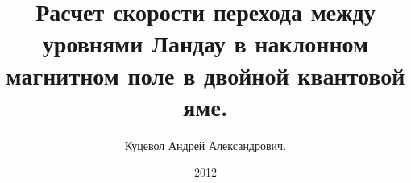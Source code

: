 \usepackage[cm-default]{fontspec} %
\usepackage{xunicode} %
\usepackage{xltxtra} %
\usepackage{indentfirst} %

\usepackage{cmap}
\usepackage[english,russian]{babel}
\usepackage{amssymb,amsfonts,amsmath,mathtext}
\usepackage{cite,enumerate,float,indentfirst}



\setsansfont{Times New Roman}
\setmonofont{Times New Roman}
\setmainfont{Times New Roman} %

\emergencystretch=0.74cm


\title{Расчет скорости перехода между уровнями Ландау в наклонном магнитном поле в двойной квантовой яме.}
\author{Куцевол Андрей Александрович.}
\date{2012}


\newcommand{\beq}{\begin{equation}\begin{gathered}}
\newcommand{\beqn}{\begin{equation}\begin{gathered} \nonumber }
\newcommand{\eeq}{\end{gathered}\end{equation}}


\newcommand{\bdft}{\begin{dft}}
\newcommand{\edft}{\end{dft}}

\newcommand{\bexe}{\begin{exe}}
\newcommand{\eexe}{\end{exe}}

\newcommand{\brem}{\begin{rem}}
\newcommand{\erem}{\end{rem}}

\newcommand{\btrm}{\begin{trm}}
\newcommand{\etrm}{\end{trm}}
\newcommand{\angstr}{\stackrel{\circ}{\mathrm{A}}}

\newcommand{\bprf}{\begin{prf}}
\newcommand{\eprf}{\end{prf}}


\newcommand{\pal}{\partial}
\newcommand{\my}{\mu}

\newcommand{\hx}{\hspace{1ex}}
\newcommand{\hxx}{\hspace{2ex}}
\newcommand{\hxxx}{\hspace{3ex}}


\newcommand{\bfr}{\mathbf{r}}
\newcommand{\bft}{\mathbf{t}}
\newcommand{\bfn}{\mathbf{n}}
\newcommand{\bfm}{\mathbf{m}}
\newcommand{\bfi}{\mathbf{i}}
\newcommand{\bfj}{\mathbf{j}}
\newcommand{\bfk}{\mathbf{k}}
\newcommand{\bfb}{\mathbf{b}}
\newcommand{\bfx}{\mathbf{x}}
\newcommand{\bfy}{\mathbf{y}}
\newcommand{\bfz}{\mathbf{z}}
\newcommand{\bfu}{\mathbf{u}}
\newcommand{\bfl}{\mathbf{l}}
\newcommand{\vomg}{\vec{\omega}}